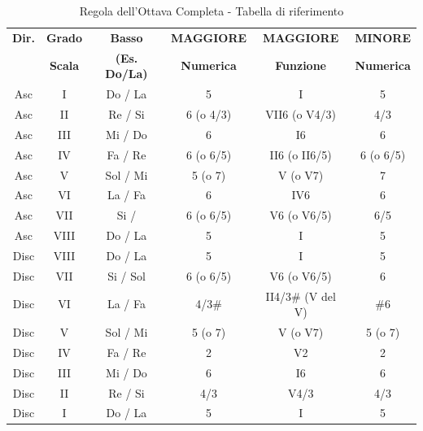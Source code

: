 






\begin{table}[h]
	\centering
	\caption{Regola dell'Ottava Completa - Tabella di riferimento}
	\label{tab:regola_ottava_completa_riepilogo}
	\small
	\begin{tabular}{|c|c|c|c|c|c|}
		\hline
		\textbf{Dir.} & \textbf{Grado} & \textbf{Basso} & \textbf{MAGGIORE} & \textbf{MAGGIORE} & \textbf{MINORE} \\
		& \textbf{Scala} & \textbf{(Es. Do/La)} & \textbf{Numerica} & \textbf{Funzione} & \textbf{Numerica} \\
		\hline
		Asc & I & Do / La & 5 & I & 5 \\
		Asc & II & Re / Si & 6 (o 4/3) & VII6 (o V4/3) & 4/3 \\
		Asc & III & Mi / Do & 6 & I6 & 6 \\
		Asc & IV & Fa / Re & 6 (o 6/5) & II6 (o II6/5) & 6 (o 6/5) \\
		Asc & V & Sol / Mi & 5 (o 7) & V (o V7) & 7 \\
		Asc & VI & La / Fa & 6 & IV6 & 6 \\
		Asc & VII & Si / \Soldiesis  & 6 (o 6/5) & V6 (o V6/5) & 6/5 \\
		Asc & VIII & Do / La & 5 & I & 5 \\
		\hline
		Disc & VIII & Do / La & 5 & I & 5 \\
		Disc & VII & Si / Sol & 6 (o 6/5) & V6 (o V6/5) & 6 \\
		Disc & VI & La / Fa & 4/3\# & II4/3\# (V del V) & \#6 \\
		Disc & V & Sol / Mi & 5 (o 7) & V (o V7) & 5 (o 7) \\
		Disc & IV & Fa / Re & 2 & V2 & 2 \\
		Disc & III & Mi / Do & 6 & I6 & 6 \\
		Disc & II & Re / Si & 4/3 & V4/3 & 4/3 \\
		Disc & I & Do / La & 5 & I & 5 \\
		\hline
	\end{tabular}
\end{table}
